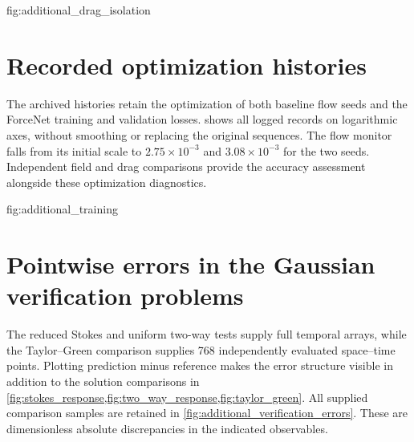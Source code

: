 {fig:additional_drag_isolation}
\FloatBarrier

\section{Recorded optimization histories}
The archived histories retain the optimization of both baseline flow
seeds and the ForceNet training and validation losses.
 shows all logged records on logarithmic
axes, without smoothing or replacing the original sequences. The flow
monitor falls from its initial scale to $2.75\times10^{-3}$ and
$3.08\times10^{-3}$ for the two seeds. Independent field and drag comparisons provide the
accuracy assessment alongside these optimization diagnostics.

{fig:additional_training}
\FloatBarrier

\section{Pointwise errors in the Gaussian verification problems}
The reduced Stokes and uniform two-way tests supply full temporal arrays,
while the Taylor--Green comparison supplies 768 independently evaluated
space--time points. Plotting prediction minus reference makes the error
structure visible in addition to the solution comparisons in
\cref{fig:stokes_response,fig:two_way_response,fig:taylor_green}.
All supplied comparison samples are retained in
\cref{fig:additional_verification_errors}. These are dimensionless
absolute discrepancies in the indicated observables.

